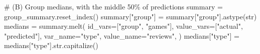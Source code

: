 \documentclass[
  letterpaper,
  DIV=11,
  numbers=noendperiod]{scrartcl}
\newenvironment{Shaded}{\begin{snugshade}}{\end{snugshade}}
\newcommand{\BuiltInTok}[1]{\textcolor[rgb]{0.00,0.23,0.31}{#1}}
\newcommand{\CommentTok}[1]{\textcolor[rgb]{0.37,0.37,0.37}{#1}}
\newcommand{\NormalTok}[1]{\textcolor[rgb]{0.00,0.23,0.31}{#1}}
\newcommand{\OperatorTok}[1]{\textcolor[rgb]{0.37,0.37,0.37}{#1}}
\newcommand{\StringTok}[1]{\textcolor[rgb]{0.13,0.47,0.30}{#1}}
\begin{document}
\begin{Shaded}
\begin{Highlighting}[]
\CommentTok{\# (B) Group medians, with the middle 50\% of predictions}
\NormalTok{summary }\OperatorTok{=}\NormalTok{ group\_summary.reset\_index()}
\NormalTok{summary[}\StringTok{"group"}\NormalTok{] }\OperatorTok{=}\NormalTok{ summary[}\StringTok{"group"}\NormalTok{].astype(}\BuiltInTok{str}\NormalTok{)}
\NormalTok{medians }\OperatorTok{=}\NormalTok{ summary.melt(}
\NormalTok{    id\_vars}\OperatorTok{=}\NormalTok{[}\StringTok{"group"}\NormalTok{, }\StringTok{"games"}\NormalTok{], value\_vars}\OperatorTok{=}\NormalTok{[}\StringTok{"actual"}\NormalTok{, }\StringTok{"predicted"}\NormalTok{],}
\NormalTok{    var\_name}\OperatorTok{=}\StringTok{"type"}\NormalTok{, value\_name}\OperatorTok{=}\StringTok{"reviews"}\NormalTok{,}
\NormalTok{)}
\NormalTok{medians[}\StringTok{"type"}\NormalTok{] }\OperatorTok{=}\NormalTok{ medians[}\StringTok{"type"}\NormalTok{].}\BuiltInTok{str}\NormalTok{.capitalize()}


\end{Highlighting}
\end{Shaded}
\end{document}
